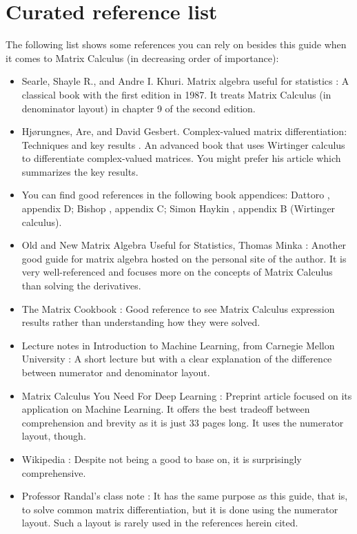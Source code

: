 \section{Curated reference list}
The following list shows some references you can rely on besides this guide when it comes to Matrix Calculus (in decreasing order of importance):
\begin{itemize}
    \item Searle, Shayle R., and Andre I. Khuri. Matrix algebra useful for statistics \cite{searle2017matrix}: A classical book with the first edition in 1987. It treats Matrix Calculus (in denominator layout) in chapter 9 of the second edition.
    \item Hj\o rungnes, Are, and David Gesbert. Complex-valued matrix differentiation: Techniques and key results \cite{hjorungnes2011complex}. An advanced book that uses Wirtinger calculus to differentiate complex-valued matrices. You might prefer his article \cite{hjorungnes2007complex} which summarizes the key results.
    \item You can find good references in the following book appendices: Dattoro \cite{dattorroConvexOptimizationEuclidean2010}, appendix D; Bishop \cite{bishopPatternRecognitionMachine2006}, appendix C; Simon Haykin \cite{haykin2009neural}, appendix B (Wirtinger calculus).
    \item Old and New Matrix Algebra Useful for Statistics, Thomas Minka \cite{ThomasMinka}: Another good guide for matrix algebra hosted on the personal site of the author. It is very well-referenced and focuses more on the concepts of Matrix Calculus than solving the derivatives.
    \item The Matrix Cookbook \cite{petersen2008matrix}: Good reference to see Matrix Calculus expression results rather than understanding how they were solved.
    \item Lecture notes in Introduction to Machine Learning, from Carnegie Mellon University \cite{Singh}: A short lecture but with a clear explanation of the difference between numerator and denominator layout.
    \item Matrix Calculus You Need For Deep Learning \cite{parrMatrixCalculusYou2018}: Preprint article focused on its application on Machine Learning. It offers the best tradeoff between comprehension and brevity as it is just 33 pages long. It uses the numerator layout, though.
    \item Wikipedia \cite{Matrixca44:online}: Despite not being a good to base on, it is surprisingly comprehensive.
    \item Professor Randal's class note \cite{barnes2006matrix}: It has the same purpose as this guide, that is, to solve common matrix differentiation, but it is done using the numerator layout. Such a layout is rarely used in the references herein cited.
\end{itemize}

